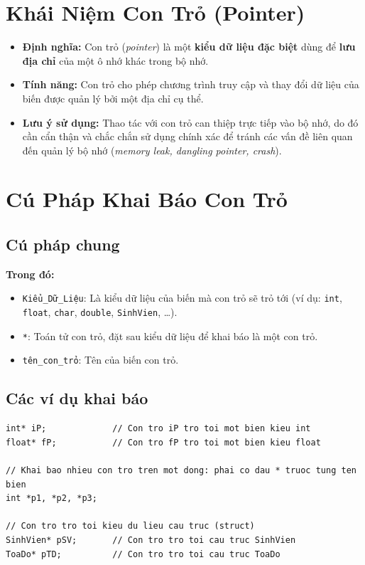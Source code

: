 \documentclass[12pt,a4paper]{article}
\begin{document}
\section{Khái Niệm Con Trỏ (Pointer)}
\begin{itemize}[itemsep=0.25em]
    \item \textbf{Định nghĩa:} Con trỏ (\textit{pointer}) là một \textbf{kiểu dữ liệu đặc biệt} dùng để \textbf{lưu địa chỉ} của một ô nhớ khác trong bộ nhớ.
    \item \textbf{Tính năng:} Con trỏ cho phép chương trình truy cập và thay đổi dữ liệu của biến được quản lý bởi một địa chỉ cụ thể.
    \item \textbf{Lưu ý sử dụng:} Thao tác với con trỏ can thiệp trực tiếp vào bộ nhớ, do đó cần cẩn thận và chắc chắn sử dụng chính xác để tránh các vấn đề liên quan đến quản lý bộ nhớ (\textit{memory leak, dangling pointer, crash}).
\end{itemize}

\section{Cú Pháp Khai Báo Con Trỏ}

\subsection{Cú pháp chung}
\begin{center}
\end{center}
\textbf{Trong đó:}
\begin{itemize}[itemsep=0.15em]
    \item \texttt{Kiểu\_Dữ\_Liệu}: Là kiểu dữ liệu của biến mà con trỏ sẽ trỏ tới (ví dụ: \texttt{int}, \texttt{float}, \texttt{char}, \texttt{double}, \texttt{SinhVien}, \dots).
    \item \texttt{*}: Toán tử con trỏ, đặt sau kiểu dữ liệu để khai báo là một con trỏ.
    \item \texttt{tên\_con\_trỏ}: Tên của biến con trỏ.
\end{itemize}

\subsection{Các ví dụ khai báo}
\begin{lstlisting}
int* iP;             // Con tro iP tro toi mot bien kieu int
float* fP;           // Con tro fP tro toi mot bien kieu float

// Khai bao nhieu con tro tren mot dong: phai co dau * truoc tung ten bien
int *p1, *p2, *p3;

// Con tro tro toi kieu du lieu cau truc (struct)
SinhVien* pSV;       // Con tro tro toi cau truc SinhVien
ToaDo* pTD;          // Con tro tro toi cau truc ToaDo
\end{lstlisting}
\end{document}

